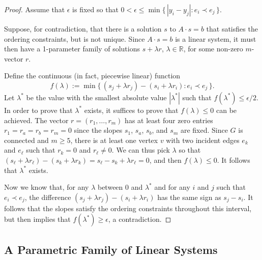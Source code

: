 \begin{proof}
	Assume that $\epsilon$ is fixed so that $0<\epsilon\le\min\{\,|y_i-y_j| : e_i\prec e_j\,\}$.
	
	Suppose, for contradiction, that there is a solution $s$ to
        $A\cdot s=b$ that satisfies the ordering
        constraints, %
	but is not unique.  Since $A\cdot s=b$ is a linear system, it
        must then have a 1-parameter family of solutions $s+\lambda r$,
        $\lambda\in\mathbb R$, for some non-zero $m$-vector $r$.
	
	
	Define the continuous (in fact, piecewise linear) function
	\begin{equation*}
	f(\lambda) := \min \{\, (s_j+\lambda r_j)-(s_i+\lambda r_i) : e_i \prec
	e_j\,\}
	.
	\end{equation*}
 Let $\lambda^*$ be the value with the smallest absolute value
	$|\lambda^*|$ such that
	$f(\lambda^*)\le\epsilon/2$. In order to prove that
        $\lambda^*$ exists, it suffices to prove that $f(\lambda)\le
        0$ can be achieved. The vector $r=(r_1,\ldots,r_m)$ has at least four zero entries
	$r_1=r_a=r_b=r_m=0$ since the slopes $s_1$, $s_a$, $s_b$, and $s_m$
	are fixed.
	Since $G$ is connected and $m\geq 5$, there is at least one vertex $v$ with two incident edges $e_k$
	and $e_\ell$ such that $r_k=0$ and $r_\ell\neq 0$. 
	We can thus pick $\lambda$ so that $(s_\ell+\lambda r_\ell)-(s_k+\lambda r_k)=s_\ell-s_k+\lambda r_\ell=0$,
	and then $f(\lambda)\le 0$. It follows that $\lambda^*$ exists.
	
	Now we know that, for any $\lambda$ between $0$ and $\lambda^*$ and for any $i$ and $j$ such that $e_i\prec e_j$, the difference $(s_j+\lambda r_j)-(s_i+\lambda r_i)$ has the same sign as $s_j-s_i$. It follows that the slopes satisfy the ordering constraints throughout
	this interval, but then
	 implies that $f(\lambda^*)\ge\epsilon$, a contradiction.
\end{proof}


\subsection{A Parametric Family of Linear Systems}

